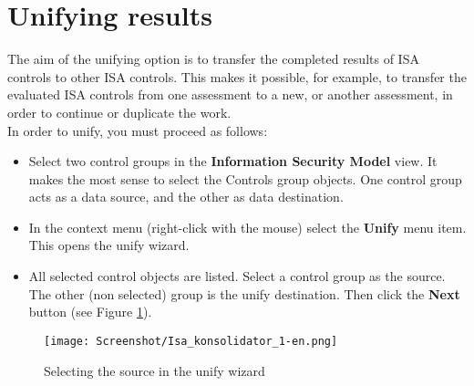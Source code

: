 \documentclass[a4paper,10pt]{book}
\begin{document}
\section{Unifying results}
The aim of the unifying option is to transfer the completed results of ISA controls to other ISA controls.
This makes it possible, for example, to transfer the evaluated ISA controls from one assessment to a new, or
another assessment, in order to continue or duplicate the work.
\newline\\
In order to unify, you must proceed as follows:
\begin{itemize}
 \item Select two control groups in the \textbf{Information Security Model} view. It makes the most sense to select
  the Controls group objects. One control group acts as a data source, and the other as data destination.
  \item In the context menu (right-click with the mouse) select the \textbf{Unify} menu item. This opens the unify wizard.
  \item All selected control objects are listed. Select a control group as the source. The other (non selected) group is
  the unify destination. Then click the \textbf{Next} button (see Figure \ref{Selecting the source in the unify wizard}).
\end{itemize}
\begin{figure}[htb!]
  \centering
  \texttt{[image: Screenshot/Isa\_konsolidator\_1-en.png]}
  \caption{\label{Selecting the source in the unify wizard} Selecting the source in the unify wizard}
\end{figure}
\end{document}
